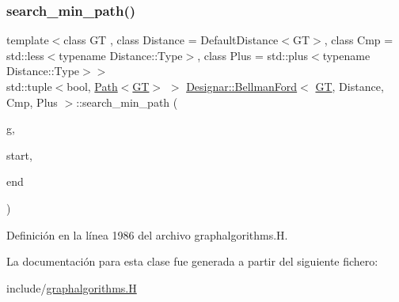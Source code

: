 \subsubsection{\texorpdfstring{search\+\_\+min\+\_\+path()}{search\_min\_path()}}
{\footnotesize\ttfamily template$<$class GT , class Distance  = Default\+Distance$<$\+G\+T$>$, class Cmp  = std\+::less$<$typename Distance\+::\+Type$>$, class Plus  = std\+::plus$<$typename Distance\+::\+Type$>$$>$ \\
std\+::tuple$<$bool, \hyperlink{class_designar_1_1_path}{Path}$<$\hyperlink{demo-buildgraph_8_c_a3001c40d2c31ca87ed96cd7d1334a55e}{GT}$>$ $>$ \hyperlink{class_designar_1_1_bellman_ford}{Designar\+::\+Bellman\+Ford}$<$ \hyperlink{demo-buildgraph_8_c_a3001c40d2c31ca87ed96cd7d1334a55e}{GT}, Distance, Cmp, Plus $>$\+::search\+\_\+min\+\_\+path (\begin{DoxyParamCaption}\item[{\hyperlink{demo-buildgraph_8_c_a3001c40d2c31ca87ed96cd7d1334a55e}{GT} \&}]{g,  }\item[{Node \&}]{start,  }\item[{Node \&}]{end }\end{DoxyParamCaption})\hspace{0.3cm}{\ttfamily [inline]}}



Definición en la línea 1986 del archivo graphalgorithms.\+H.



La documentación para esta clase fue generada a partir del siguiente fichero\+:\begin{DoxyCompactItemize}
\item 
include/\hyperlink{graphalgorithms_8_h}{graphalgorithms.\+H}\end{DoxyCompactItemize}
